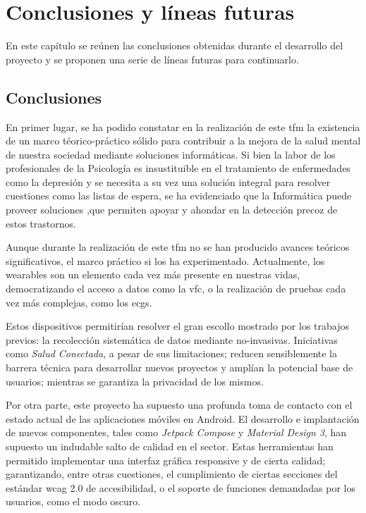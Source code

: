 \chapter{Conclusiones y líneas futuras}
\label{chapter:conclusiones}


En este capítulo se reúnen las conclusiones obtenidas durante el desarrollo del proyecto y se proponen una serie de líneas futuras para continuarlo.

\section{Conclusiones}

    En primer lugar, se ha podido constatar en la realización de este \gls{tfm} la existencia de un marco téorico-práctico sólido para contribuir a la mejora de la salud mental de nuestra sociedad mediante soluciones informáticas. Si bien la labor de los profesionales de la Psicología es insustituible en el tratamiento de enfermedades como la depresión y se necesita a su vez una solución integral para resolver cuestiones como las listas de espera, se ha evidenciado que la Informática puede proveer soluciones ,que permiten apoyar y ahondar en la detección precoz de estos trastornos.

    Aunque durante la realización de este \gls{tfm} no se han producido avances teóricos significativos, el marco práctico si los ha experimentado. Actualmente, los \glspl{wearable} son un elemento cada vez más presente en nuestras vidas, democratizando el acceso a datos como la \gls{vfc}, o la realización de pruebas cada vez más complejas, como los \glspl{ecg}. 
    
    Estos dispositivos permitirían resolver el gran escollo mostrado por los trabajos previos: la recolección sistemática de datos mediante \glspl{no-invasiva}. Iniciativas como \textit{Salud Conectada}, a pesar de sus limitaciones; reducen sensiblemente la barrera técnica para desarrollar nuevos proyectos y amplían la potencial base de usuarios; mientras se garantiza la privacidad de los mismos.

    Por otra parte, este proyecto ha supuesto una profunda toma de contacto con el estado actual de las aplicaciones móviles en Android. El desarrollo e implantación de nuevos componentes, tales como \textit{Jetpack Compose} y \textit{Material Design 3}, han supuesto un indudable salto de calidad en el sector. Estas herramientas han permitido implementar una interfaz gráfica \gls{responsive} y de cierta calidad; garantizando, entre otras cuestiones, el cumplimiento de ciertas secciones del estándar \gls{wcag} 2.0 de accesibilidad, o el soporte de funciones demandadas por los usuarios, como el modo oscuro.
    

